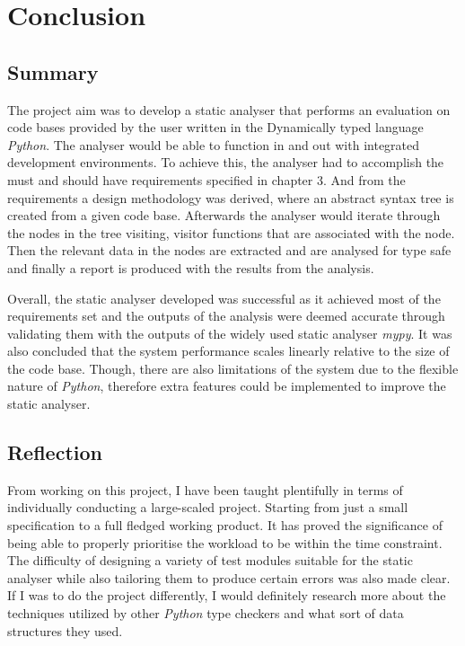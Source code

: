 \documentclass{l4proj}
\begin{document}
\chapter{Conclusion}    
\section{Summary}
The project aim was to develop a static analyser that performs an evaluation on code bases provided by the user written in the Dynamically typed language \emph{Python}. The analyser would be able to function in and out with integrated development environments. To achieve this, the analyser had to accomplish the must and should have requirements specified in chapter 3. And from the requirements a design methodology was derived, where an abstract syntax tree is created from a given code base. Afterwards the analyser would iterate through the nodes in the tree visiting, visitor functions that are associated with the node. Then the relevant data in the nodes are extracted and are analysed for type safe and finally a report is produced with the results from the analysis.

Overall, the static analyser developed was successful as it achieved most of the requirements set and the outputs of the analysis were deemed accurate through validating them with the outputs of the widely used static analyser \emph{mypy}. It was also concluded that the system performance scales linearly relative to the size of the code base. Though, there are also limitations of the system due to the flexible nature of \emph{Python}, therefore extra features could be implemented to improve the static analyser.

\section{Reflection}
From working on this project, I have been taught plentifully in terms of individually conducting a large-scaled project. Starting from just a small specification to a full fledged working product. It has proved the significance of being able to properly prioritise the workload to be within the time constraint. The difficulty of designing a variety of test modules suitable for the static analyser while also tailoring them to produce certain errors was also made clear. If I was to do the project differently, I would definitely research more about the techniques utilized by other \emph{Python} type checkers and what sort of data structures they used.
%
% 
\end{document}
